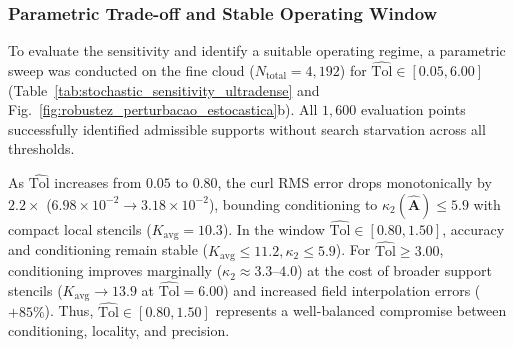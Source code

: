 \documentclass[preprint,12pt]{elsarticle}
\begin{document}
\subsubsection{Parametric Trade-off and Stable Operating Window}
\label{subsubsec:parametric_tradeoff}

To evaluate the sensitivity and identify a suitable operating regime, a parametric sweep was conducted on the fine cloud ($N_{\mathrm{total}} = 4{,}192$) for $\widehat{\mathrm{Tol}} \in [0.05, 6.00]$ (Table~\ref{tab:stochastic_sensitivity_ultradense} and Fig.~\ref{fig:robustez_perturbacao_estocastica}b). All $1{,}600$ evaluation points successfully identified admissible supports without search starvation across all thresholds.

As $\widehat{\mathrm{Tol}}$ increases from $0.05$ to $0.80$, the curl RMS error drops monotonically by $2.2\times$ ($6.98 \times 10^{-2} \to 3.18 \times 10^{-2}$), bounding conditioning to $\kappa_2(\widehat{\mathbf{A}}) \le 5.9$ with compact local stencils ($K_{\mathrm{avg}} = 10.3$). In the window $\widehat{\mathrm{Tol}} \in [0.80, 1.50]$, accuracy and conditioning remain stable ($K_{\mathrm{avg}} \le 11.2, \kappa_2 \le 5.9$). For $\widehat{\mathrm{Tol}} \ge 3.00$, conditioning improves marginally ($\kappa_2 \approx 3.3\text{--}4.0$) at the cost of broader support stencils ($K_{\mathrm{avg}} \to 13.9$ at $\widehat{\mathrm{Tol}} = 6.00$) and increased field interpolation errors ($+85\%$). Thus, $\widehat{\mathrm{Tol}} \in [0.80, 1.50]$ represents a well-balanced compromise between conditioning, locality, and precision.
\end{document}
